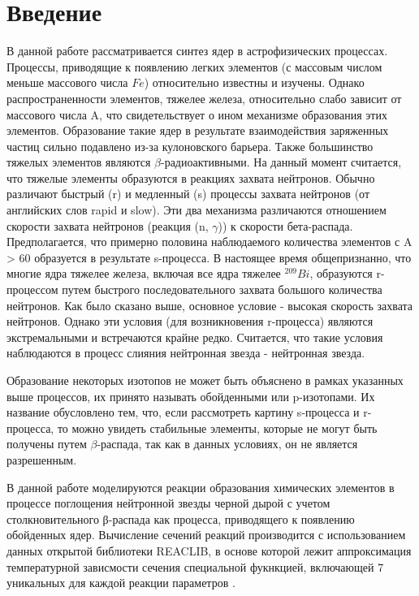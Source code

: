\documentclass[14pt, a4paper]{article}
\numberwithin{figure}{section}
\numberwithin{equation}{section}
\begin{document}
\section*{\centering Введение}
В данной работе рассматривается синтез ядер в астрофизических процессах. Процессы, приводящие к появлению легких элементов (с массовым числом меньше массового числа $Fe$) относительно известны и изучены. Однако распространенности элементов, тяжелее железа, относительно слабо зависит от массового числа A, что свидетельствует о ином механизме образования этих элементов. Образование такие ядер в результате взаимодействия заряженных частиц сильно подавлено из-за кулоновского барьера. Также большинство тяжелых элементов являются $\beta$-радиоактивными. На данный момент считается, что тяжелые элементы образуются в реакциях захвата нейтронов. Обычно различают быстрый (r) и медленный (s) процессы захвата нейтронов (от английских слов rapid и slow). Эти два механизма различаются отношением скорости захвата нейтронов (реакция (n, $\gamma$)) к скорости бета-распада. Предполагается, что примерно половина наблюдаемого количества элементов с A > 60 образуется в результате s-процесса. В настоящее время общепризнанно, что многие ядра тяжелее железа, включая все ядра тяжелее $^{209}Bi$, образуются r-процессом путем быстрого последовательного захвата большого количества нейтронов. Как было сказано выше, основное условие - высокая скорость захвата нейтронов. Однако эти условия (для возникновения r-процесса) являются экстремальными и встречаются крайне редко.  Считается, что такие условия наблюдаются в процесс слияния нейтронная звезда - нейтронная звезда.

Образование некоторых изотопов не может быть объяснено в рамках указанных выше процессов, их принято называть обойденными или p-изотопами. Их название обусловлено тем, что, если рассмотреть картину s-процесса и r-процесса, то можно увидеть стабильные элементы, которые не могут быть получены путем $\beta$-распада, так как в данных условиях, он не является разрешенным.

В данной работе моделируются реакции образования химических элементов в процессе поглощения нейтронной звезды черной дырой \cite{bhns1} с учетом столкновительного β-распада как процесса, приводящего к появлению обойденных ядер. Вычисление сечений реакций производится с использованием данных открытой библиотеки REACLIB, в основе которой лежит аппроксимация температурной зависмости сечения специальной фукнкцией, включающей 7 уникальных для каждой реакции параметров \cite{jina}.
\end{document}
